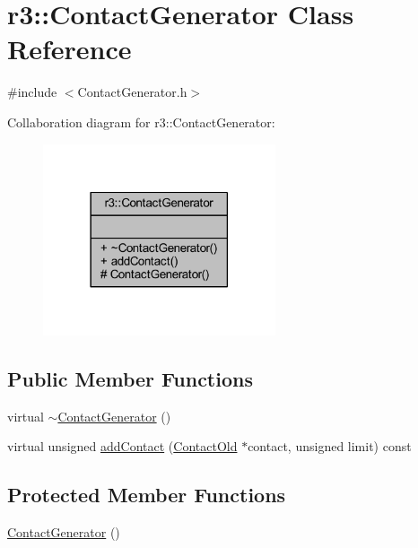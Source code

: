 \hypertarget{classr3_1_1_contact_generator}{}\section{r3\+:\+:Contact\+Generator Class Reference}
\label{classr3_1_1_contact_generator}


{\ttfamily \#include $<$Contact\+Generator.\+h$>$}



Collaboration diagram for r3\+:\+:Contact\+Generator\+:\nopagebreak
\begin{figure}[H]
\begin{center}
\leavevmode
\includegraphics[width=194pt]{classr3_1_1_contact_generator__coll__graph}
\end{center}
\end{figure}
\subsection*{Public Member Functions}
\begin{DoxyCompactItemize}
\item 
virtual \mbox{\hyperlink{classr3_1_1_contact_generator_a5b44b4e2b114259c30eae2d5d0ca4202}{$\sim$\+Contact\+Generator}} ()
\item 
virtual unsigned \mbox{\hyperlink{classr3_1_1_contact_generator_ad72e6b61035d682f3d424cbd0c6d73c3}{add\+Contact}} (\mbox{\hyperlink{classr3_1_1_contact_old}{Contact\+Old}} $\ast$contact, unsigned limit) const
\end{DoxyCompactItemize}
\subsection*{Protected Member Functions}
\begin{DoxyCompactItemize}
\item 
\mbox{\hyperlink{classr3_1_1_contact_generator_ae71d8c8d7e9e57ba10de178fe12b4084}{Contact\+Generator}} ()
\end{DoxyCompactItemize}


